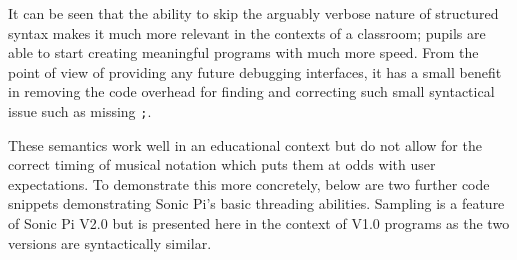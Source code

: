 \documentclass[11pt, abstracton, twoside, titlepage=true]{scrartcl}
\begin{document}
It can be seen that the ability to skip the arguably verbose nature of 
structured syntax makes it much more relevant in the contexts of a classroom; 
pupils are able to start creating meaningful programs with much more speed. From 
the point of view of providing any future debugging interfaces, it has a small 
benefit in removing the code overhead for finding and correcting such small 
syntactical issue such as missing \texttt{;}. 

These semantics work well in an educational context but do not allow for the 
correct timing of musical notation which puts them at odds with user 
expectations. To demonstrate this more concretely, below are two further code 
snippets demonstrating Sonic Pi's basic threading abilities. Sampling is a 
feature of Sonic Pi V2.0 but is presented here in the context of V1.0 
programs as the two versions are syntactically similar.
\end{document}
